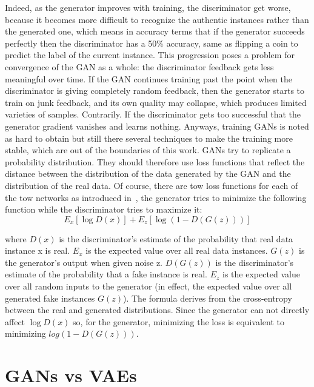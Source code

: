Indeed, as the generator improves with training, the discriminator get worse, because it becomes more difficult to recognize the authentic instances rather than the generated one, which means in accuracy terms that if the generator succeeds perfectly then the discriminator has a 50\% accuracy, same as flipping a coin to predict the label of the current instance.
This progression poses a problem for convergence of the GAN as a whole: the discriminator feedback gets less meaningful over time. If the GAN continues training past the point when the discriminator is giving completely random feedback, then the generator starts to train on junk feedback, and its own quality may collapse, which produces limited varieties of samples. Contrarily. If the discriminator gets too successful that the generator gradient vanishes and learns nothing.
Anyways, training GANs is noted as hard to obtain but still there several techniques to make the training more stable, which are out of the boundaries of this work. GANs try to replicate a probability distribution. They should therefore use loss functions that reflect the distance between the distribution of the data generated by the GAN and the distribution of the real data. Of course, there are tow loss functions for each of the tow networks as introduced in~\cite{goodfellow2014generative}, the generator tries to minimize the following function while the discriminator tries to maximize it:
\begin{equation}
E_x[\log{D(x)}] + E_z[\log{(1-D(G(z)))}]
\label{eq:GAN_loss}
\end{equation}

where $D(x)$ is the discriminator's estimate of the probability that real data instance x is real.
$E_x$ is the expected value over all real data instances. $G(z)$ is the generator's output when given noise z. $D(G(z))$ is the discriminator's estimate of the probability that a fake instance is real.
$E_z$ is the expected value over all random inputs to the generator (in effect, the expected value over all generated fake instances $G(z)$). The formula derives from the cross-entropy between the real and generated distributions. Since the generator can not directly affect $\log{D(x)}$ so, for the generator, minimizing the loss is equivalent to minimizing $log(1 - D(G(z)))$.

\section{GANs vs VAEs}

